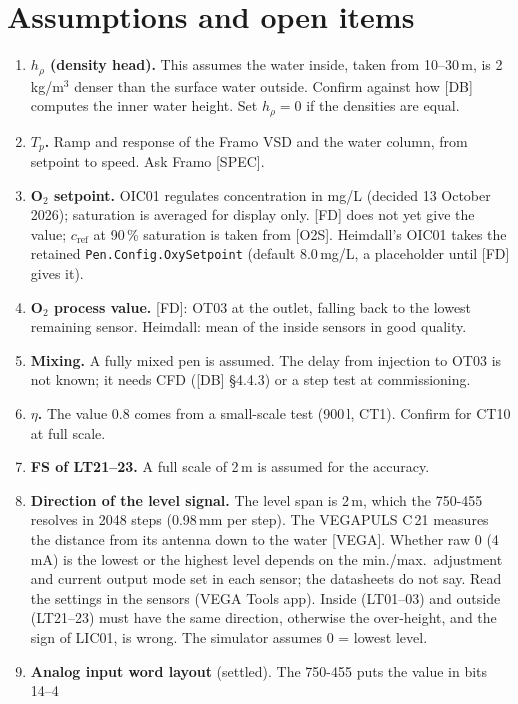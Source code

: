 \documentclass[11pt]{article}
\begin{document}
\section{Assumptions and open items}\label{sec:open}
\begin{enumerate}
  \item \textbf{$h_\rho$ (density head).} This assumes the water inside, taken from 10--30\,m, is
        2\,kg/m$^3$ denser than the surface water outside. Confirm against how [DB] computes
        the inner water height. Set $h_\rho=0$ if the densities are equal.
  \item \textbf{$T_p$.} Ramp and response of the Framo VSD and the water column, from setpoint
        to speed. Ask Framo [SPEC].
  \item \textbf{O$_2$ setpoint.} OIC01 regulates concentration in mg/L (decided 13 October
        2026); saturation is averaged for display only. [FD] does not yet give the value;
        $c_\text{ref}$ at 90\,\% saturation is taken from [O2S]. Heimdall's OIC01 takes the retained
        \texttt{Pen.Config.OxySetpoint} (default 8.0\,mg/L, a placeholder until [FD] gives it).
  \item \textbf{O$_2$ process value.} [FD]: OT03 at the outlet, falling back to the lowest
        remaining sensor. Heimdall: mean of the inside sensors in good quality.
  \item \textbf{Mixing.} A fully mixed pen is assumed. The delay from injection to OT03 is not
        known; it needs CFD ([DB] §4.4.3) or a step test at commissioning.
  \item \textbf{$\eta$.} The value 0.8 comes from a small-scale test (900\,l, CT1). Confirm for
        CT10 at full scale.
  \item \textbf{FS of LT21--23.} A full scale of 2\,m is assumed for the accuracy.
  \item \textbf{Direction of the level signal.} The level span is 2\,m, which the 750-455 resolves
        in 2048 steps (0.98\,mm per step). The VEGAPULS C\,21 measures the distance from
        its antenna down to the water [VEGA]. Whether raw 0 (4\,mA) is the lowest or the highest
        level depends on the min./max.\ adjustment and current output mode set in each sensor;
        the datasheets do not say. Read the settings in the sensors (VEGA Tools app). Inside
        (LT01--03) and outside (LT21--23) must have the same direction, otherwise the
        over-height, and the sign of LIC01, is wrong. The simulator assumes 0 = lowest level.
  \item \textbf{Analog input word layout} (settled). The 750-455 puts the value in bits 14--4

\end{enumerate}
\end{document}
